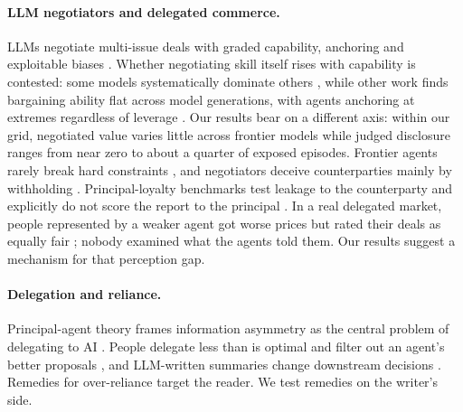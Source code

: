 \paragraph{LLM negotiators and delegated commerce.} LLMs negotiate multi-issue deals with graded capability, anchoring and exploitable biases \citep{davidson2024evaluating,bianchi2024negotiationarena,abdelnabi2024cooperation}. Whether negotiating skill itself rises with capability is contested: some models systematically dominate others \citep{rios2025illusion}, while other work finds bargaining ability flat across model generations, with agents anchoring at extremes regardless of leverage \citep{shah2025llmrationalis}. Our results bear on a different axis: within our grid, negotiated value varies little across frontier models while judged disclosure ranges from near zero to about a quarter of exposed episodes. Frontier agents rarely break hard constraints \citep{zhang2026termsbench,zhu2025automated}, and negotiators deceive counterparties mainly by withholding \citep{miceli2026salesbots,zhu2026piearena}. Principal-loyalty benchmarks test leakage to the counterparty and explicitly do not score the report to the principal \citep{li2026principalbench,liu2026sovereign}. In a real delegated market, people represented by a weaker agent got worse prices but rated their deals as equally fair \citep{anthropic2026projectdeal}; nobody examined what the agents told them. Our results suggest a mechanism for that perception gap.

\paragraph{Delegation and reliance.} Principal-agent theory frames information asymmetry as the central problem of delegating to AI \citep{kolt2025governing,rauba2026principalagent}. People delegate less than is optimal and filter out an agent's better proposals \citep{zhu2026chooseyouragent}, and LLM-written summaries change downstream decisions \citep{alessa2025biasinduction}. Remedies for over-reliance target the reader. We test remedies on the writer's side.

